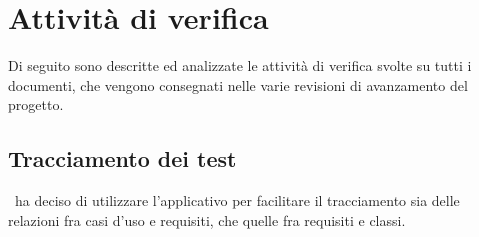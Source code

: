 \documentclass[../PianoDiQualifica_v4.0.0.tex]{subfiles}
\begin{document}
\appendix
\section{Attività di verifica}\label{sec:verifica}
Di seguito sono descritte ed analizzate le attività di verifica svolte su tutti i documenti, che vengono consegnati nelle varie revisioni di avanzamento del progetto.

\subsection{Tracciamento dei test}

	\kpanic\ ha deciso di utilizzare l'applicativo  per facilitare il tracciamento sia delle relazioni fra casi d'uso e requisiti, che quelle fra requisiti e classi.

\end{document}
